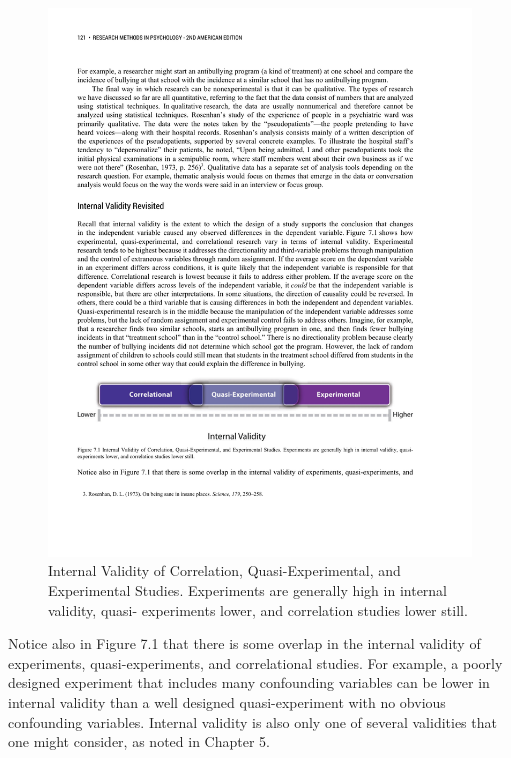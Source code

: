 \begin{figure}
\includegraphics[width=\linewidth]{figures/C7internal.pdf}
\caption{Internal Validity of Correlation, Quasi-Experimental, and Experimental Studies. Experiments are generally high in internal validity, quasi- experiments lower, and correlation studies lower still.
}
\label{fig:internal}
\end{figure}

Notice also in Figure 7.1 that there is some overlap in the internal validity of experiments, quasi-experiments, and correlational studies. For example, a poorly designed experiment that includes many confounding variables can be lower in internal validity than a well designed quasi-experiment with no obvious confounding variables. Internal validity is also only one of several validities that one might consider, as noted in Chapter 5.


